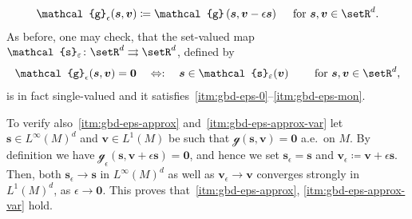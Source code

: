 \documentclass[reqno,a4paper]{amsart}
\def\vec#1{\boldsymbol{#1}}
\def\toto{\rightrightarrows}
\def\b0{\vec{0}}
\def\bs{\vec{s}}
\def\bv{\vec{v}}
\def\gbd{\vec{\mathcal{g}}}
\def\Srel{\vec{\mathcal{s}}}
\def\Seps{\Srel_{\varepsilon}}
\begin{document}
\begin{example}
\begin{enumerate}[label = (\alph*)]
			\begin{align*}
				\gbd_{\epsilon} (\bs, \bv) \coloneqq \gbd\left(\bs,\bv - \epsilon \bs\right) \quad \text{ for } \bs, \bv \in \setR^d.
			\end{align*}
			As before, one may check, that the set-valued map $\Seps \colon \setR^d \toto \setR^d$, defined by 
			\begin{align*}
				\gbd_\epsilon(\bs, \bv) = \b0 \quad \Leftrightarrow : \quad   \bs \in  \Seps(\bv) \qquad \text{ for } \bs,\bv \in \setR^d,
			\end{align*}
			is in fact single-valued and it satisfies~\ref{itm:gbd-eps-0}--\ref{itm:gbd-eps-mon}.  
			
			To verify also~\ref{itm:gbd-eps-approx} and~\ref{itm:gbd-eps-approx-var} let $\bs \in L^\infty(M)^d$ and $\bv \in L^1(M)$ be such that $\gbd(\bs,\bv) = \b0$ a.e.~on $M$. 
			By definition we have $\gbd_\epsilon(\bs,\bv+ \epsilon \bs) = \b0$, and hence we set $\bs_{\epsilon} = \bs$ and $\bv_{\epsilon} \coloneqq \bv + \epsilon \bs$. 
			Then, both $\bs_{\epsilon} \to \bs$ in $L^\infty(M)^d$ as well as $\bv_\epsilon \to \bv$ converges  strongly in $L^1(M)^d$, as $\epsilon \to \b0$. 
			This proves that~\ref{itm:gbd-eps-approx}, \ref{itm:gbd-eps-approx-var} hold. 
		\end{enumerate}
	\end{example}
	
\end{document}
